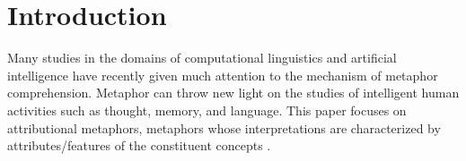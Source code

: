 \newlength{\minipagelist}\setlength{\minipagelist}{120mm}
\newenvironment{slist}{}{}
\newcommand{\SNAME}{}



\maketitle

\section{Introduction} \label{sec:intro}
Many studies in the domains of computational linguistics 
\cite{Weiner84,Fass91,Martin92} and artificial intelligence
\cite{Falkenhainer86,Indurkhya87,IJCAI91} have recently given much 
attention to the mechanism of metaphor comprehension.
Metaphor can throw new light on the studies of intelligent human activities
such as thought, memory, and language.
This paper focuses on attributional metaphors, 
metaphors whose interpretations are characterized by 
attributes/features of the constituent concepts \cite{Gentner88}.

